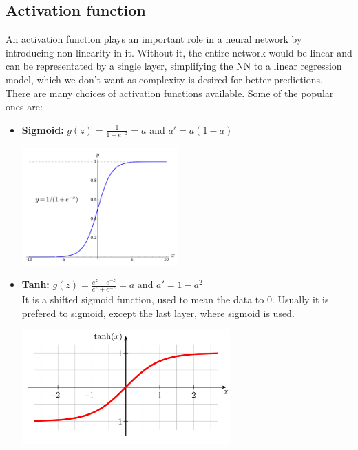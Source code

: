 \documentclass[12pt]{article}
\begin{document}
\subsection*{Activation function}
An activation function plays an important role in a neural network by introducing non-linearity in it. Without it, the entire network would be linear and can be representated by a single layer, simplifying the NN to a linear regression model, which we don't want as complexity is desired for better predictions.\\
There are many choices of activation functions available. Some of the popular ones are:
\begin{itemize}
    \item \textbf{Sigmoid: }$g(z) = \frac{1}{1+e^{-z}}=a$ and $a' = a(1-a)$\\
        \begin{center}
            \includegraphics[width=6cm]{sigmoid.png}
        \end{center}
    \item \textbf{Tanh: }$g(z) = \frac{e^z - e^{-z}}{e^z + e^{-z}}=a$ and $a' = 1-a^2$\\It is a shifted sigmoid function, used to mean the data to 0. Usually it is prefered to sigmoid, except the last layer, where sigmoid is used.
        \begin{center}
            \includegraphics[width=8cm]{tanh.png}
        \end{center}
        

\end{itemize}
\end{document}
